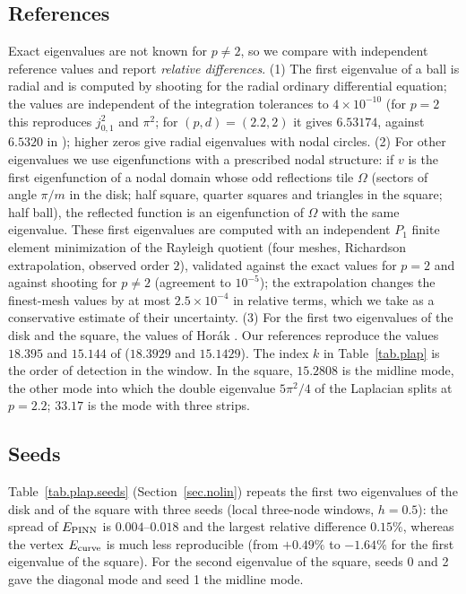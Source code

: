\documentclass[10pt]{amsart}
\theoremstyle{definition}
\theoremstyle{remark}
\theoremstyle{plain}
\begin{document}
\subsection{References}\label{app.plap.ref}
Exact eigenvalues are not known for $p\ne2$, so we compare with independent reference values and report
\emph{relative differences}. (1) The first eigenvalue of a ball is radial and is computed by shooting for
the radial ordinary differential equation; the values are independent of the integration tolerances to
$4\times10^{-10}$ (for $p=2$ this reproduces $j_{0,1}^2$ and $\pi^2$; for $(p,d)=(2.2,2)$ it gives $6.53174$,
against $6.5320$ in \cite{HJ11}); higher zeros give radial eigenvalues with nodal circles. (2) For other
eigenvalues we use eigenfunctions with a prescribed nodal structure: if $v$ is the first eigenfunction
of a nodal domain whose odd reflections tile $\Omega$ (sectors of angle $\pi/m$ in the disk; half square,
quarter squares and triangles in the square; half ball), the reflected function is an eigenfunction of
$\Omega$ with the same eigenvalue. These first eigenvalues are computed with an independent $P_1$ finite
element minimization of the Rayleigh quotient (four meshes, Richardson extrapolation, observed order
$2$), validated against the exact values for $p=2$ and against shooting for $p\neq2$ (agreement to
$10^{-5}$); the extrapolation changes the finest-mesh values by at most $2.5\times10^{-4}$ in relative
terms, which we take as a conservative estimate of their uncertainty. (3) For the first two eigenvalues
of the disk and the square, the values of Hor\'ak \cite{HJ11}. Our references reproduce the values
$18.395$ and $15.144$ of \cite{HJ11} ($18.3929$ and $15.1429$). The index $k$ in Table~\ref{tab.plap} is
the order of detection in the window. In the square, $15.2808$ is the midline mode, the other mode into
which the double eigenvalue $5\pi^2/4$ of the Laplacian splits at $p=2.2$; $33.17$ is the mode with three
strips.

\subsection{Seeds}
Table~\ref{tab.plap.seeds} (Section~\ref{sec.nolin}) repeats the first two eigenvalues of the disk and of the square with three
seeds (local three-node windows, $h=0.5$): the spread of $E_{\rm PINN}$ is $0.004$--$0.018$ and the largest
relative difference $0.15\%$, whereas the vertex $E_{\rm curve}$ is much less reproducible (from $+0.49\%$
to $-1.64\%$ for the first eigenvalue of the square). For the second eigenvalue of the square, seeds 0
and 2 gave the diagonal mode and seed 1 the midline mode.
\end{document}
